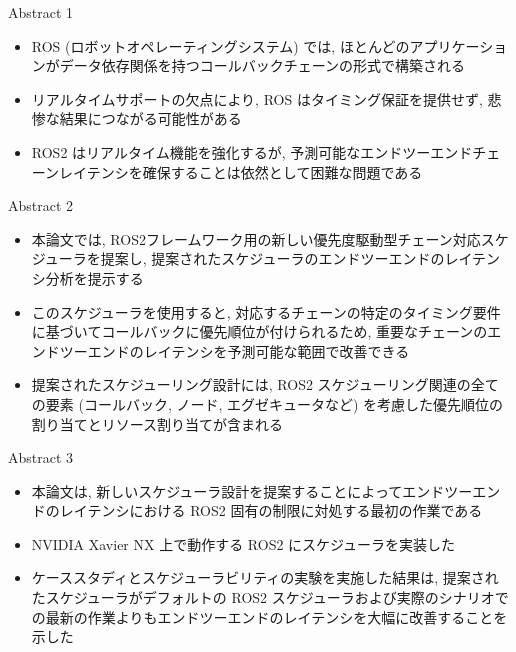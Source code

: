 
\begin{frame}{Abstract 1}
    \begin{itemize}
        \item ROS (ロボットオペレーティングシステム) では, ほとんどのアプリケーションがデータ依存関係を持つコールバックチェーンの形式で構築される
        \item リアルタイムサポートの欠点により, ROS はタイミング保証を提供せず, 悲惨な結果につながる可能性がある
        \item ROS2 はリアルタイム機能を強化するが, 予測可能なエンドツーエンドチェーンレイテンシを確保することは依然として困難な問題である
    \end{itemize}
\end{frame}

\begin{frame}{Abstract 2}
    \begin{itemize}
        \item 本論文では, ROS2フレームワーク用の新しい優先度駆動型チェーン対応スケジューラを提案し, 提案されたスケジューラのエンドツーエンドのレイテンシ分析を提示する
        \item このスケジューラを使用すると, 対応するチェーンの特定のタイミング要件に基づいてコールバックに優先順位が付けられるため, 重要なチェーンのエンドツーエンドのレイテンシを予測可能な範囲で改善できる
        \item 提案されたスケジューリング設計には, ROS2 スケジューリング関連の全ての要素 (コールバック, ノード, エグゼキュータなど) を考慮した優先順位の割り当てとリソース割り当てが含まれる
    \end{itemize}
\end{frame}

\begin{frame}{Abstract 3}
    \begin{itemize}
        \item 本論文は, 新しいスケジューラ設計を提案することによってエンドツーエンドのレイテンシにおける ROS2 固有の制限に対処する最初の作業である
        \item NVIDIA Xavier NX 上で動作する ROS2 にスケジューラを実装した
        \item ケーススタディとスケジューラビリティの実験を実施した結果は, 提案されたスケジューラがデフォルトの ROS2 スケジューラおよび実際のシナリオでの最新の作業よりもエンドツーエンドのレイテンシを大幅に改善することを示した
    \end{itemize}
\end{frame}
